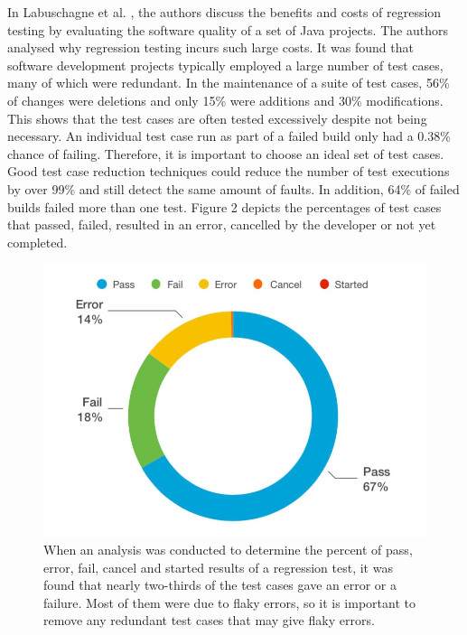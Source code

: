 \documentclass[journal, onecolumn]{IEEEtran}
\begin{document}
	\newline \newline
	In Labuschagne et al. \cite{regression}, the authors discuss the benefits and costs of regression testing by evaluating the software quality of a set of Java projects.
	\newline \newline
	The authors analysed why regression testing incurs such large costs. It was found that software development projects typically employed a large number of test cases, many of which were redundant. In the maintenance of a suite of test cases, 56\% of changes were deletions and only 15\% were additions and 30\% modifications. This shows that the test cases are often tested excessively despite not being necessary. An individual test case run as part of a failed build only had a 0.38\% chance of failing. Therefore, it is important to choose an ideal set of test cases. Good test case reduction techniques could reduce the number of test executions by over 99\% and still detect the same amount of faults. In addition, 64\% of failed builds failed more than one test. Figure 2 depicts the percentages of test cases that passed, failed, resulted in an error, cancelled by the developer or not yet completed.
	
	\begin{figure}[H]
		\includegraphics[scale=0.35]{pass-fail}
		\centering
		\caption{When an analysis was conducted to determine the percent of pass, error, fail, cancel and started results of a regression test, it was found that nearly two-thirds of the test cases gave an error or a failure. Most of them were due to flaky errors, so it is important to remove any redundant test cases that may give flaky errors.}
	\end{figure}
	
\end{document}
